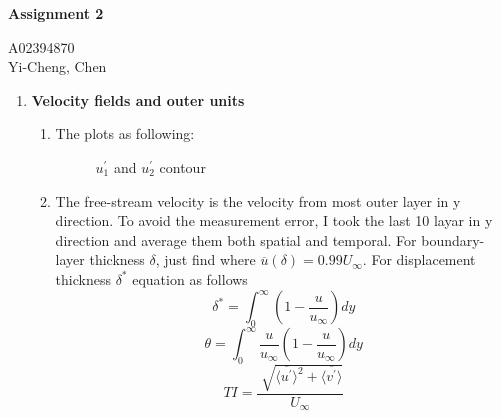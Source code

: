 \documentclass[11pt,letterpaper]{article}
\begin{document}
\begin{center} \Large
    \textbf{Assignment 2}
\end{center}
\begin{center}A02394870 \\ Yi-Cheng, Chen \end{center}

\begin{enumerate}
    \item \textbf{Velocity fields and outer units}
          \begin{enumerate}
              \item The plots as following:
                    \begin{figure}[H]
                        \centering
                        \caption{$u_1^{\prime}$ and $u_2^{\prime}$ contour}
                        \label{Fig.main}
                    \end{figure}
              \item The free-stream velocity is the velocity from most outer layer in y direction.
                    To avoid the measurement error, I took the last 10 layar in y direction and average them both spatial and temporal.
                    For boundary-layer thickness $\delta$, just find where $\overline{u}(\delta) = 0.99 U_{\infty}$.
                    For displacement thickness $\delta^*$ equation as follows
                    \begin{equation}
                        \delta^* = \int_{0}^{\infty} (1 - \frac{u}{u_\infty})dy
                    \end{equation}
                    \begin{equation}
                        \theta = \int_{0}^{\infty} \frac{u}{u_\infty} (1 - \frac{u}{u_\infty})dy
                    \end{equation}
                    \begin{equation}
                        TI = \frac{\sqrt[]{ \langle \overline{u^\prime} \rangle^2 + \langle \overline{v^\prime} \rangle}}{U_\infty}

\end{equation}
\end{enumerate}
\end{enumerate}
\end{document}
